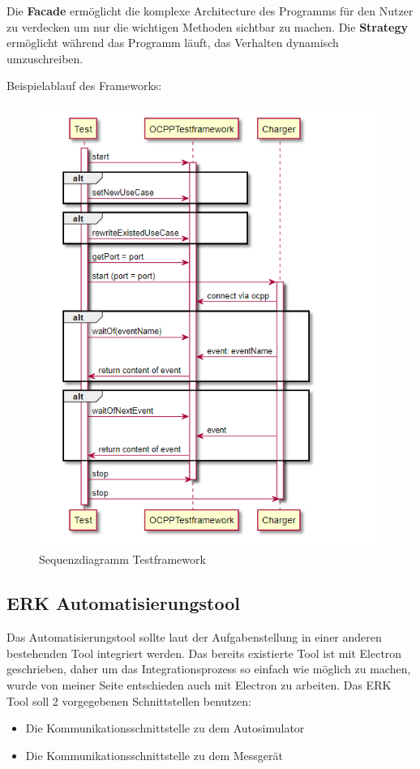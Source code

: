     Die \textbf{Facade} ermöglicht die komplexe Architecture des Programms für den Nutzer zu verdecken um nur die wichtigen Methoden sichtbar zu machen.
    Die \textbf{Strategy} ermöglicht während das Programm läuft, das Verhalten dynamisch umzuschreiben.

    \newpage
    Beispielablauf des Frameworks:
    \begin{figure}[H]
        \centering
        \includegraphics[width=1\textwidth]{./images/UMLFramework.png}
        \caption{Sequenzdiagramm Testframework}
        \label{fig:flow around cylinder}
    \end{figure}


    \subsection{ERK Automatisierungstool}
        Das Automatisierungstool sollte laut der Aufgabenstellung in einer anderen bestehenden Tool integriert werden.
        Das bereits existierte Tool ist mit Electron geschrieben, daher um das Integrationsprozess so einfach wie möglich zu machen,
        wurde von meiner Seite entschieden auch mit Electron zu arbeiten. Das ERK Tool soll 2 vorgegebenen Schnittstellen benutzen:
        \begin{itemize}
            \item Die Kommunikationsschnittstelle zu dem Autosimulator
            \item Die Kommunikationsschnittstelle zu dem Messgerät 
        \end{itemize}

